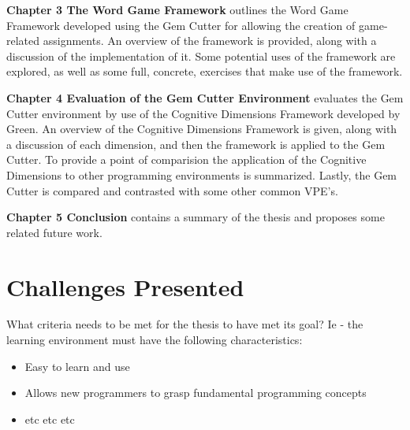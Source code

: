 	
\textbf{Chapter 3 The Word Game Framework} outlines the Word Game Framework developed using the Gem Cutter for allowing the creation of game-related assignments.  An overview of the framework is provided, along with a discussion of the implementation of it.  Some potential uses of the framework are explored, as well as some full, concrete, exercises that make use of the framework.


\textbf{Chapter 4 Evaluation of the Gem Cutter Environment} evaluates the Gem Cutter environment by use of the Cognitive Dimensions Framework developed by Green.  An overview of the Cognitive Dimensions Framework is given, along with a discussion of each dimension, and then the framework is applied to the Gem Cutter.  To provide a point of comparision the application of the Cognitive Dimensions to other programming environments is summarized.  Lastly, the Gem Cutter is compared and contrasted with some other common VPE's.


\textbf{Chapter 5 Conclusion} contains a summary of the thesis and proposes some related future work.

\section{Challenges Presented}

What criteria needs to be met for the thesis to have met its goal?  Ie - the learning environment must have the following characteristics:

\begin{itemize}
	\item Easy to learn and use
	\item Allows new programmers to grasp fundamental programming concepts
	\item etc etc etc
\end{itemize}

